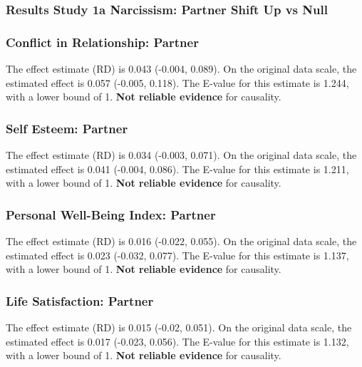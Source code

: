 \documentclass[
  singlecolumn]{article}
\begin{document}
\newpage{}

\subsubsection{Results Study 1a Narcissism: Partner Shift Up vs
Null}\label{results-study-1a-narcissism-partner-shift-up-vs-null}

\subsubsection{Conflict in Relationship:
Partner}\label{conflict-in-relationship-partner-5}

The effect estimate (RD) is 0.043 (-0.004, 0.089). On the original data
scale, the estimated effect is 0.057 (-0.005, 0.118). The E-value for
this estimate is 1.244, with a lower bound of 1. \textbf{Not reliable
evidence} for causality.

\subsubsection{Self Esteem: Partner}\label{self-esteem-partner-5}

The effect estimate (RD) is 0.034 (-0.003, 0.071). On the original data
scale, the estimated effect is 0.041 (-0.004, 0.086). The E-value for
this estimate is 1.211, with a lower bound of 1. \textbf{Not reliable
evidence} for causality.

\subsubsection{Personal Well-Being Index:
Partner}\label{personal-well-being-index-partner-5}

The effect estimate (RD) is 0.016 (-0.022, 0.055). On the original data
scale, the estimated effect is 0.023 (-0.032, 0.077). The E-value for
this estimate is 1.137, with a lower bound of 1. \textbf{Not reliable
evidence} for causality.

\subsubsection{Life Satisfaction:
Partner}\label{life-satisfaction-partner-5}

The effect estimate (RD) is 0.015 (-0.02, 0.051). On the original data
scale, the estimated effect is 0.017 (-0.023, 0.056). The E-value for
this estimate is 1.132, with a lower bound of 1. \textbf{Not reliable
evidence} for causality.
\end{document}

